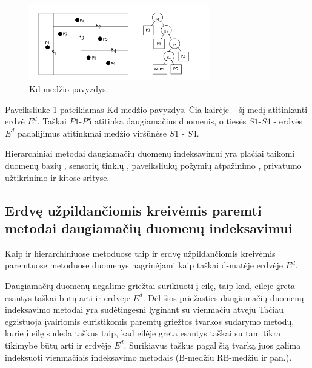\begin{figure}[H]
\begin{center}
\includegraphics[width=0.7\textwidth]{img/KdTreeExample.png}
\caption{Kd-medžio pavyzdys.}
\label{img:KdTreeExample}
\end{center}
\end{figure}

Paveiksliuke \ref{img:KdTreeExample} pateikiamas Kd-medžio pavyzdys.
Čia kairėje -- šį medį atitinkanti erdvė $E^d$.
Taškai $P1$-$P5$ atitinka daugiamačius duomenis, o tiesės $S1$-$S4$ - erdvės $E^d$ padalijimus atitinkmai medžio viršūnėse $S1$ - $S4$.

Hierarchiniai metodai daugiamačių duomenų indeksavimui yra plačiai taikomi duomenų bazių \cite{bohm2001searching}, sensorių tinklų \cite{li2003multi}, paveiksliukų požymių atpažinimo \cite{silpa2008optimised}, privatumo užtikrinimo \cite{hore2012secure} \cite{xiao2010differentially} ir kitose srityse.

\subsection{Erdvę užpildančiomis kreivėmis paremti metodai daugiamačių duomenų indeksavimui}

Kaip ir hierarchiniuose metoduose taip ir erdvę užpildančiomis kreivėmis paremtuose metoduose duomenys nagrinėjami kaip taškai d-matėje erdvėje $E^d$.

Daugiamačių duomenų negalime griežtai surikiuoti į eilę, taip kad, eilėje greta esantys taškai būtų arti ir erdvėje $E^d$.
Dėl šios priežasties daugiamačių duomenų indeksavimo metodai yra sudėtingesni lyginant su vienmačiu atveju \cite{gaede1998multidimensional} \cite{bohm2001searching}
Tačiau egzistuoja įvairiomis euristikomis paremtų griežtos tvarkos sudarymo metodų, kurie į eilę sudeda taškus taip, kad eilėje greta esantys taškai su tam tikra tikimybe būtų arti ir erdvėje $E^d$.
Surikiavus taškus pagal šią tvarką juos galima indeksuoti vienmačiais indeksavimo metodais (B-medžiu \cite{comer1979ubiquitous} RB-medžiu \cite{hanke1997relaxed} ir pan.).

